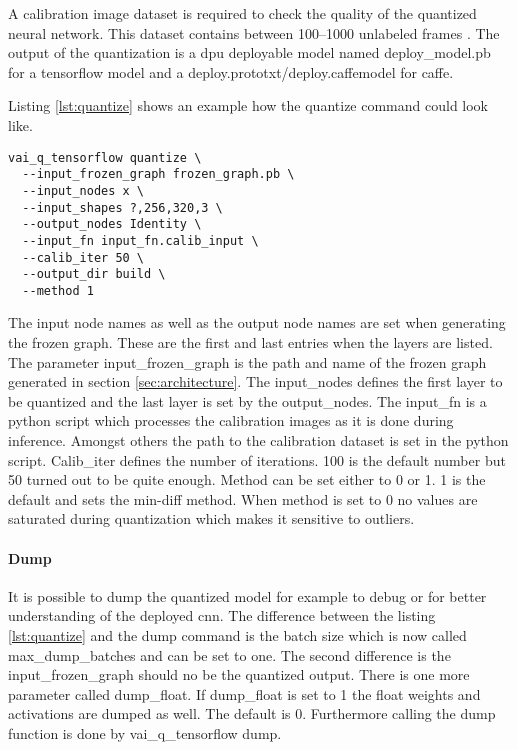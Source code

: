 A calibration image dataset is required to check the quality of the quantized neural network.
This dataset contains between \numrange{100}{1000} unlabeled frames \cite{vitis_ai_user_guide}.
The output of the quantization is a \acrshort{dpu} deployable model named deploy\_model.pb for a tensorflow model and a deploy.prototxt/deploy.caffemodel for caffe.

Listing \ref{lst:quantize} shows an example how the quantize command could look like.

\begin{lstlisting}[style=bash, caption={Quantize command}, label=lst:quantize]
  vai_q_tensorflow quantize \
  --input_frozen_graph frozen_graph.pb \
  --input_nodes x \
  --input_shapes ?,256,320,3 \
  --output_nodes Identity \
  --input_fn input_fn.calib_input \
  --calib_iter 50 \
  --output_dir build \
  --method 1
\end{lstlisting}

The input node names as well as the output node names are set when generating the frozen graph.
These are the first and last entries when the layers are listed.
The parameter input\_frozen\_graph is the path and name of the frozen graph generated in section \ref{sec:architecture}. 
The input\_nodes defines the first layer to be quantized and the last layer is set by the output\_nodes.
The input\_fn is a python script which processes the calibration images as it is done during inference.
Amongst others the path to the calibration dataset is set in the python script.
Calib\_iter defines the number of iterations.
100 is the default number but 50 turned out to be quite enough.
Method can be set either to 0 or 1.
1 is the default and sets the min-diff method.
When method is set to 0 no values are saturated during quantization which makes it sensitive to outliers.

\paragraph{Dump}
It is possible to dump the quantized model for example to debug or for better understanding of the deployed \acrshort{cnn}.
The difference between the listing \ref{lst:quantize} and the dump command is the batch size which is now called max\_dump\_batches and can be set to one.
The second difference is the input\_frozen\_graph should no be the quantized output.
There is one more parameter called dump\_float.
If dump\_float is set to 1 the float weights and activations are dumped as well.
The default is 0.
Furthermore calling the dump function is done by vai\_q\_tensorflow dump.

